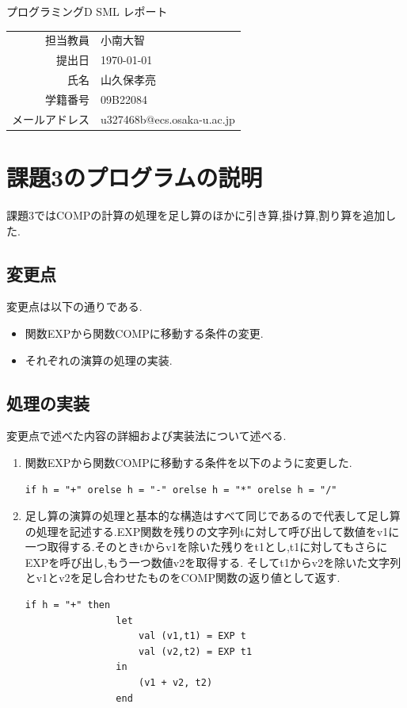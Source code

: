 \documentclass[dvipdfmx]{jarticle}
\begin{document}
\begin{titlepage}
    \begin{center}
        \vspace*{60pt}
        {\LARGE プログラミングD SML レポート}
        \vspace*{240pt}\\
        \begin{tabular}{rl}
            担当教員 & 小南大智\\
            提出日 & \today\\
            氏名 & 山久保孝亮\\
            学籍番号 & 09B22084\\
            メールアドレス & u327468b@ecs.osaka-u.ac.jp
        \end{tabular}
    \end{center}
\end{titlepage}

\section{課題3のプログラムの説明}
課題3ではCOMPの計算の処理を足し算のほかに引き算,掛け算,割り算を追加した.
\subsection{変更点}
変更点は以下の通りである.
\begin{itemize}
    \item 関数EXPから関数COMPに移動する条件の変更.
    \item それぞれの演算の処理の実装.
\end{itemize}

\subsection{処理の実装}
変更点で述べた内容の詳細および実装法について述べる.
\begin{enumerate}
    \item 関数EXPから関数COMPに移動する条件を以下のように変更した.
    \begin{lstlisting}[caption=処理の実装,label=fuga]
        if h = "+" orelse h = "-" orelse h = "*" orelse h = "/" 
    \end{lstlisting}
    \item 足し算の演算の処理と基本的な構造はすべて同じであるので代表して足し算の処理を記述する.EXP関数を残りの文字列tに対して呼び出して数値をv1に一つ取得する.そのときtからv1を除いた残りをt1とし,t1に対してもさらにEXPを呼び出し,もう一つ数値v2を取得する.
    そしてt1からv2を除いた文字列とv1とv2を足し合わせたものをCOMP関数の返り値として返す.
    \begin{lstlisting}[caption=処理の実装,label=fuga]
        if h = "+" then
                let
                    val (v1,t1) = EXP t
                    val (v2,t2) = EXP t1
                in
                    (v1 + v2, t2)
                end
    \end{lstlisting}
    
\end{enumerate}
\end{document}
